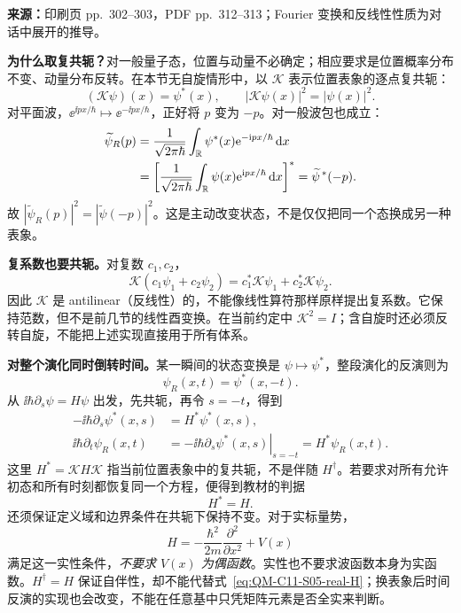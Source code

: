 \textbf{来源：}印刷页 pp.~302--303，PDF pp.~312--313；Fourier 变换和反线性性质为对话中展开的推导。

\textbf{为什么取复共轭？}对一般量子态，位置与动量不必确定；相应要求是位置概率分布不变、动量分布反转。在本节无自旋情形中，以 $\mathcal K$ 表示位置表象的逐点复共轭：
\begin{equation}
  \boxed{(\mathcal K\psi)(x)=\psi^*(x)},\qquad
  |\mathcal K\psi(x)|^2=|\psi(x)|^2.
\end{equation}
对平面波，$\ee^{\ii px/\hbar}\mapsto\ee^{-\ii px/\hbar}$，正好将 $p$ 变为 $-p$。对一般波包也成立：
\begin{align}
  \widetilde\psi_R(p)
    &=\frac1{\sqrt{2\pi\hbar}}\int_{\mathbb{R}}
                    \psi^*(x)\mathrm{e}^{-\mathrm{i} px/\hbar}\mathop{}\!\mathrm{d} x\\
    &=\left[\frac1{\sqrt{2\pi\hbar}}\int_{\mathbb{R}}
                    \psi(x)\mathrm{e}^{\mathrm{i} px/\hbar}\mathop{}\!\mathrm{d} x\right]^*
      =\widetilde\psi^{\,*}(-p).
\end{align}
故 $|\widetilde\psi_R(p)|^2=|\widetilde\psi(-p)|^2$。这是主动改变状态，不是仅仅把同一个态换成另一种表象。

\textbf{复系数也要共轭。}对复数 $c_1,c_2$，
\begin{equation}
  \mathcal K(c_1\psi_1+c_2\psi_2)
      =c_1^*\mathcal K\psi_1+c_2^*\mathcal K\psi_2.
\end{equation}
因此 $\mathcal K$ 是 antilinear（反线性）的，不能像线性算符那样原样提出复系数。它保持范数，但不是前几节的线性酉变换。在当前约定中 $\mathcal K^2=I$；含自旋时还必须反转自旋，不能把上述实现直接用于所有体系。

\textbf{对整个演化同时倒转时间。}某一瞬间的状态变换是 $\psi\mapsto\psi^*$，整段演化的反演则为
\begin{equation}
  \boxed{\psi_R(x,t)=\psi^*(x,-t)}.
\end{equation}
从 $\ii\hbar\partial_s\psi=H\psi$ 出发，先共轭，再令 $s=-t$，得到
\begin{align}
  -\ii\hbar\partial_s\psi^*(x,s)&=H^*\psi^*(x,s),\\
  \ii\hbar\partial_t\psi_R(x,t)
    &=-\ii\hbar\left.\partial_s\psi^*(x,s)\right|_{s=-t}
      =H^*\psi_R(x,t).
\end{align}
这里 $H^*=\mathcal K H\mathcal K$ 指当前位置表象中的复共轭，不是伴随 $H^\dagger$。若要求对所有允许初态和所有时刻都恢复同一个方程，便得到教材的判据
\begin{equation}
  \boxed{H^*=H}.
  \label{eq:QM-C11-S05-real-H}
\end{equation}
还须保证定义域和边界条件在共轭下保持不变。对于实标量势，
\begin{equation}
  H=-\frac{\hbar^2}{2m}\frac{\partial^2}{\partial x^2}+V(x)
\end{equation}
满足这一实性条件，\emph{不要求 $V(x)$ 为偶函数}。实性也不要求波函数本身为实函数。$H^\dagger=H$ 保证自伴性，却不能代替式~\eqref{eq:QM-C11-S05-real-H}；换表象后时间反演的实现也会改变，不能在任意基中只凭矩阵元素是否全实来判断。

